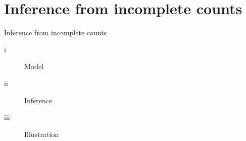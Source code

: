 \documentclass[11pt]{beamer}
\newcommand{\bleu}[1]{\textcolor{Framableulight}{#1}}
\begin{document}
\section{Inference from incomplete counts}
\begin{frame}{}
\begin{center}
\Huge{\bleu{Inference from incomplete counts}}
\end{center}
\begin{center}
\begin{description}
\item[i] Model
\item[ii]  Inference
\item[iii] Illustration
\end{description}
\end{center}
\end{frame}
\end{document}
